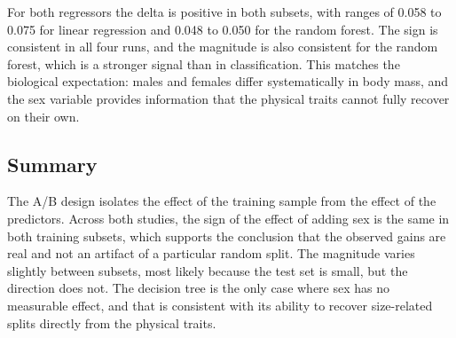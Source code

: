 For both regressors the delta is positive in both subsets, with ranges of 0.058 to 0.075 for linear regression and 0.048 to 0.050 for the random forest. The sign is consistent in all four runs, and the magnitude is also consistent for the random forest, which is a stronger signal than in classification. This matches the biological expectation: males and females differ systematically in body mass, and the sex variable provides information that the physical traits cannot fully recover on their own.

\subsection{Summary}

The A/B design isolates the effect of the training sample from the effect of the predictors. Across both studies, the sign of the effect of adding sex is the same in both training subsets, which supports the conclusion that the observed gains are real and not an artifact of a particular random split. The magnitude varies slightly between subsets, most likely because the test set is small, but the direction does not. The decision tree is the only case where sex has no measurable effect, and that is consistent with its ability to recover size-related splits directly from the physical traits.